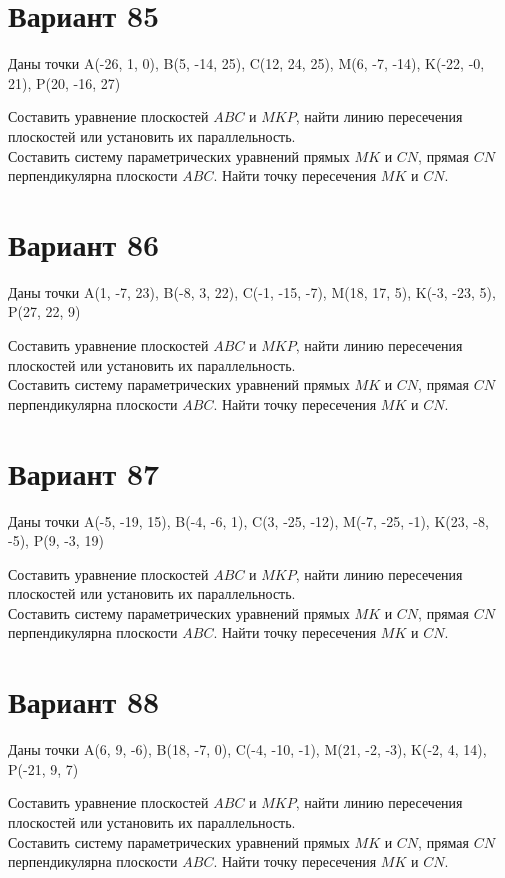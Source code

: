 \documentclass[11pt]{article}
\begin{document}
\section*{Вариант 85}
Даны точки A(-26, 1, 0), B(5, -14, 25), C(12, 24, 25), M(6, -7, -14), K(-22, -0, 21), P(20, -16, 27)

Составить уравнение плоскостей $ABC$ и $MKP$, найти линию пересечения плоскостей или установить их параллельность.\\
Составить систему параметрических уравнений прямых $MK$ и $CN$, прямая $CN$ перпендикулярна плоскости $ABC$. Найти точку пересечения $MK$ и $CN$.

\section*{Вариант 86}
Даны точки A(1, -7, 23), B(-8, 3, 22), C(-1, -15, -7), M(18, 17, 5), K(-3, -23, 5), P(27, 22, 9)

Составить уравнение плоскостей $ABC$ и $MKP$, найти линию пересечения плоскостей или установить их параллельность.\\
Составить систему параметрических уравнений прямых $MK$ и $CN$, прямая $CN$ перпендикулярна плоскости $ABC$. Найти точку пересечения $MK$ и $CN$.

\section*{Вариант 87}
Даны точки A(-5, -19, 15), B(-4, -6, 1), C(3, -25, -12), M(-7, -25, -1), K(23, -8, -5), P(9, -3, 19)

Составить уравнение плоскостей $ABC$ и $MKP$, найти линию пересечения плоскостей или установить их параллельность.\\
Составить систему параметрических уравнений прямых $MK$ и $CN$, прямая $CN$ перпендикулярна плоскости $ABC$. Найти точку пересечения $MK$ и $CN$.

\section*{Вариант 88}
Даны точки A(6, 9, -6), B(18, -7, 0), C(-4, -10, -1), M(21, -2, -3), K(-2, 4, 14), P(-21, 9, 7)

Составить уравнение плоскостей $ABC$ и $MKP$, найти линию пересечения плоскостей или установить их параллельность.\\
Составить систему параметрических уравнений прямых $MK$ и $CN$, прямая $CN$ перпендикулярна плоскости $ABC$. Найти точку пересечения $MK$ и $CN$.
\end{document}

